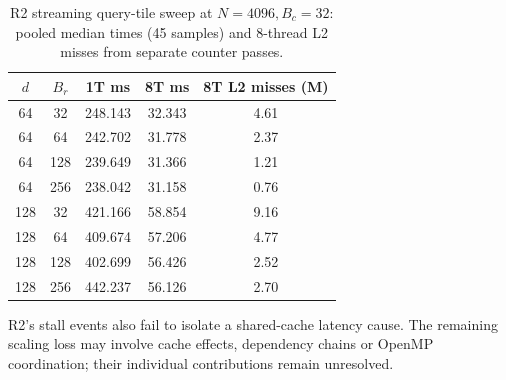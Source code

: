 \documentclass[11pt,a4paper]{article}
\begin{document}
\begin{table}[!htbp]
\centering
\fontsize{9}{11}\selectfont
\setlength{\tabcolsep}{5pt}
\renewcommand{\arraystretch}{1.16}
\caption{R2 streaming query-tile sweep at $N=4096,B_c=32$: pooled median
times (45 samples) and 8-thread L2 misses from separate counter passes.}
\label{tab:large-tiles}
\begin{tabular}{@{}cc ccc@{}}
\toprule
$d$ & $B_r$ & 1T ms & 8T ms & 8T L2 misses (M) \\
\midrule
64 & 32  & 248.143 & 32.343 & 4.61 \\
64 & 64  & 242.702 & 31.778 & 2.37 \\
64 & 128 & 239.649 & 31.366 & 1.21 \\
64 & 256 & 238.042 & 31.158 & 0.76 \\
\midrule
128 & 32  & 421.166 & 58.854 & 9.16 \\
128 & 64  & 409.674 & 57.206 & 4.77 \\
128 & 128 & 402.699 & 56.426 & 2.52 \\
128 & 256 & 442.237 & 56.126 & 2.70 \\
\bottomrule
\end{tabular}
\end{table}

R2's stall events also fail to isolate a shared-cache latency cause.
The remaining scaling loss may involve cache effects, dependency chains or
OpenMP coordination; their individual contributions remain unresolved.
\end{document}
